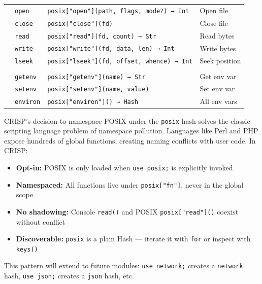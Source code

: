 \begin{table}[H]
\begin{tabular}{@{}lllp{3.2cm}@{}}
\rowcolor{softviolet!30}
& \texttt{open} & \texttt{posix["open"](path, flags, mode?) → Int} & Open file \\
& \texttt{close} & \texttt{posix["close"](fd)} & Close file \\
& \texttt{read} & \texttt{posix["read"](fd, count) → Str} & Read bytes \\
& \texttt{write} & \texttt{posix["write"](fd, data, len) → Int} & Write bytes \\
& \texttt{lseek} & \texttt{posix["lseek"](fd, offset, whence) → Int} & Seek position \\
\rowcolor{lightlavender}
\multicolumn{4}{@{}l@{}}{\textbf{\textcolor{darkpurple}{Env}}} \\
\rowcolor{softviolet!30}
& \texttt{getenv} & \texttt{posix["getenv"](name) → Str} & Get env var \\
& \texttt{setenv} & \texttt{posix["setenv"](name, value)} & Set env var \\
& \texttt{environ} & \texttt{posix["environ"]() → Hash} & All env vars \\
\bottomrule
\end{tabular}
\end{table}

\begin{tcolorbox}[colback=lightlavender, colframe=softvioletdark, title=\textbf{\textcolor{darkpurple}{Design Note: Namespaced POSIX}}, fonttitle=\bfseries, sharp corners]
CRISP's decision to namespace POSIX under the \texttt{posix} hash solves the classic scripting language problem of namespace pollution. Languages like Perl and PHP expose hundreds of global functions, creating naming conflicts with user code. In CRISP:

\begin{itemize}
    \item \textbf{Opt-in:} POSIX is only loaded when \texttt{use posix;} is explicitly invoked
    \item \textbf{Namespaced:} All functions live under \texttt{posix["fn"]}, never in the global scope
    \item \textbf{No shadowing:} Console \texttt{read()} and POSIX \texttt{posix["read"]()} coexist without conflict
    \item \textbf{Discoverable:} \texttt{posix} is a plain Hash — iterate it with \texttt{for} or inspect with \texttt{keys()}
\end{itemize}

This pattern will extend to future modules: \texttt{use network;} creates a \texttt{network} hash, \texttt{use json;} creates a \texttt{json} hash, etc.
\end{tcolorbox}
